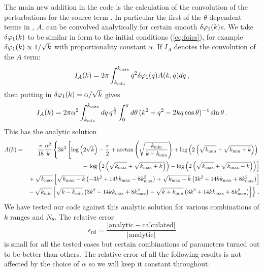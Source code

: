 The main new addition in the code is the calculation of the
convolution of the perturbations for the source term
. In particular the first of the $\theta$ dependent terms in
, $A$,
can be convolved analytically for certain smooth $\delta\varphi_{1}(k)$s. 
 We take $\delta\varphi_{1}(k)$ to be similar in form to the initial conditions
(\ref{eq:foics}), for example $\delta\varphi_{1}(k)\propto 1/\sqrt{k}$ with proportionality constant
$\alpha$.
If $I_A$ denotes the convolution of the $A$ term:
% 
\begin{equation}
 I_A (k) = 2\pi \int_{k_{\mathrm{min}}}^{k_{\mathrm{max}}} q^2 \delta\varphi_{1}(q) A(k, q) dq \,,
\end{equation}
% 
then putting in $\delta\varphi_{1}(k) = \alpha/\sqrt{k}$ gives
% 
\begin{equation}
 I_A(k) = 2\pi \alpha^2 \int_{k_{\mathrm{min}}}^{k_{\mathrm{max}}} dq\, q^{\frac{3}{2}}
\int_{0}^{\pi} d\theta\, (k^2 + q^2 -2k q \cos{\theta})^{-4} \sin{\theta}\,. 
\end{equation}
% 
This has the analytic solution
% 
\begin{eqnarray}
\label{eq:err-analytic-num}
 A(k) &=& \frac{\pi}{18}\frac{\alpha^2}{k} \left\{ 
3k^3\left[\log\left(2\sqrt{k}\right) - \frac{\pi}{2}  + 
\arctan\left(\sqrt{\frac{k_{\mathrm{min}}}{k-k_{\mathrm{min}}}}\right) 
 + \log\left(2\left(\sqrt{k_{\mathrm{min}}} + \sqrt{k_{\mathrm{min}} + k}\right)\right) \right.\right. \nonumber \\
&& \left. -\, \log\left(2\left(\sqrt{k_{\mathrm{max}}} + \sqrt{k_{\mathrm{max}} + k}\right)\right) 
  - \log\left(2\left(\sqrt{k_{\mathrm{max}}} + \sqrt{k_{\mathrm{max}} - k}\right)\right) \right]  \nonumber \\
&& +\, \sqrt{k_{\mathrm{max}}}\left[\sqrt{k_{\mathrm{max}} -k} \left(-3k^2 + 14kk_{\mathrm{max}} - 8k_{\mathrm{max}}^2\right)  
 + \sqrt{k_{\mathrm{max}} +k} \left(3k^2 + 14kk_{\mathrm{max}} + 8k_{\mathrm{max}}^2\right)\right] \nonumber \\ 
&& \left. -\, \sqrt{k_{\mathrm{min}}}\left[\sqrt{k -k_{\mathrm{min}}} \left(3k^2 - 14kk_{\mathrm{max}} + 8k_{\mathrm{max}}^2\right) 
 - \sqrt{k +k_{\mathrm{min}}} \left(3k^2 + 14kk_{\mathrm{max}} + 8k_{\mathrm{max}}^2\right)\right] \right\} \,.
\end{eqnarray}
%
We have tested our code against this analytic solution for various
combinations of $k$ ranges and $N_\theta$. The relative error
%
\begin{equation}
 \epsilon_\mathrm{rel} = \frac{|\mathrm{analytic}- \mathrm{calculated} |}{|\mathrm{analytic}|}
\end{equation}
%
is small for all the tested cases but certain combinations of
parameters turned out to be better than others. The relative error of
all the following results is not affected by the choice of $\alpha$ so
we will keep it constant throughout.

